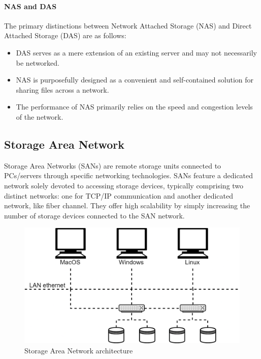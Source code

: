 \paragraph*{NAS and DAS}
The primary distinctions between Network Attached Storage (NAS) and Direct Attached Storage (DAS) are as follows:
\begin{itemize}
    \item DAS serves as a mere extension of an existing server and may not necessarily be networked.
    \item NAS is purposefully designed as a convenient and self-contained solution for sharing files across a network.
    \item The performance of NAS primarily relies on the speed and congestion levels of the network.
\end{itemize}

\subsection{Storage Area Network}
Storage Area Networks (SANs) are remote storage units connected to PCs/servers through specific networking technologies. 
SANs feature a dedicated network solely devoted to accessing storage devices, typically comprising two distinct networks: one for TCP/IP communication and another dedicated network, like fiber channel. 
They offer high scalability by simply increasing the number of storage devices connected to the SAN network.
\begin{figure}[H]
    \centering
    \includegraphics[width=0.6\linewidth]{images/san.png}
    \caption{Storage Area Network architecture}
\end{figure}

